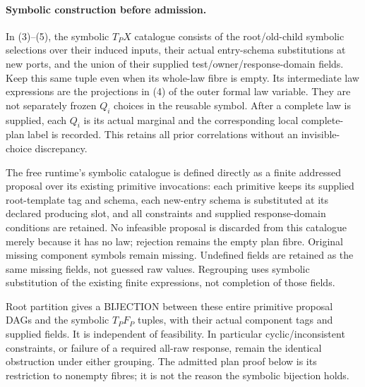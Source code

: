 \documentclass[11pt]{article}
\begin{document}
\paragraph{Symbolic construction before admission.}
In (3)--(5), the symbolic $T_PX$ catalogue consists of the root/old-child symbolic selections over their induced inputs, their actual entry-schema substitutions at new ports, and the union of their supplied test/owner/response-domain fields. Keep this same tuple even when its whole-law fibre is empty. Its intermediate law expressions are the projections in (4) of the outer formal law variable. They are not separately frozen $Q_i$ choices in the reusable symbol. After a complete law is supplied, each $Q_i$ is its actual marginal and the corresponding local complete-plan label is recorded. This retains all prior correlations without an invisible-choice discrepancy.

The free runtime's symbolic catalogue is defined directly as a finite addressed proposal over its existing primitive invocations: each primitive keeps its supplied root-template tag and schema, each new-entry schema is substituted at its declared producing slot, and all constraints and supplied response-domain conditions are retained. No infeasible proposal is discarded from this catalogue merely because it has no law; rejection remains the empty plan fibre. Original missing component symbols remain missing. Undefined fields are retained as the same missing fields, not guessed raw values. Regrouping uses symbolic substitution of the existing finite expressions, not completion of those fields.

Root partition gives a BIJECTION between these entire primitive proposal DAGs and the symbolic $T_PF_P$ tuples, with their actual component tags and supplied fields. It is independent of feasibility. In particular cyclic/inconsistent constraints, or failure of a required all-raw response, remain the identical obstruction under either grouping. The admitted plan proof below is its restriction to nonempty fibres; it is not the reason the symbolic bijection holds.
\end{document}
